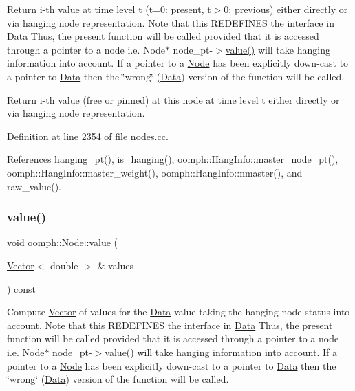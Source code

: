 Return i-\/th value at time level t (t=0\+: present, t$>$0\+: previous) either directly or via hanging node representation. Note that this R\+E\+D\+E\+F\+I\+N\+ES the interface in \hyperlink{classoomph_1_1Data}{Data} Thus, the present function will be called provided that it is accessed through a pointer to a node i.\+e. Node$\ast$ node\+\_\+pt-\/$>$\hyperlink{classoomph_1_1Node_afcc5cdba40bca251826ae5bee5ca15b4}{value()} will take hanging information into account. If a pointer to a \hyperlink{classoomph_1_1Node}{Node} has been explicitly down-\/cast to a pointer to \hyperlink{classoomph_1_1Data}{Data} then the \char`\"{}wrong\char`\"{} (\hyperlink{classoomph_1_1Data}{Data}) version of the function will be called. 

Return i-\/th value (free or pinned) at this node at time level t either directly or via hanging node representation. 

Definition at line 2354 of file nodes.\+cc.



References hanging\+\_\+pt(), is\+\_\+hanging(), oomph\+::\+Hang\+Info\+::master\+\_\+node\+\_\+pt(), oomph\+::\+Hang\+Info\+::master\+\_\+weight(), oomph\+::\+Hang\+Info\+::nmaster(), and raw\+\_\+value().

\mbox{\label{classoomph_1_1Node_a3c9b6bdba6c5e33d2bb6b0a4799598ef}} 
\subsubsection{\texorpdfstring{value()}{value()}\hspace{0.1cm}{\footnotesize\ttfamily [3/5]}}
{\footnotesize\ttfamily void oomph\+::\+Node\+::value (\begin{DoxyParamCaption}\item[{\hyperlink{classoomph_1_1Vector}{Vector}$<$ double $>$ \&}]{values }\end{DoxyParamCaption}) const}



Compute \hyperlink{classoomph_1_1Vector}{Vector} of values for the \hyperlink{classoomph_1_1Data}{Data} value taking the hanging node status into account. Note that this R\+E\+D\+E\+F\+I\+N\+ES the interface in \hyperlink{classoomph_1_1Data}{Data} Thus, the present function will be called provided that it is accessed through a pointer to a node i.\+e. Node$\ast$ node\+\_\+pt-\/$>$\hyperlink{classoomph_1_1Node_afcc5cdba40bca251826ae5bee5ca15b4}{value()} will take hanging information into account. If a pointer to a \hyperlink{classoomph_1_1Node}{Node} has been explicitly down-\/cast to a pointer to \hyperlink{classoomph_1_1Data}{Data} then the \char`\"{}wrong\char`\"{} (\hyperlink{classoomph_1_1Data}{Data}) version of the function will be called. 

